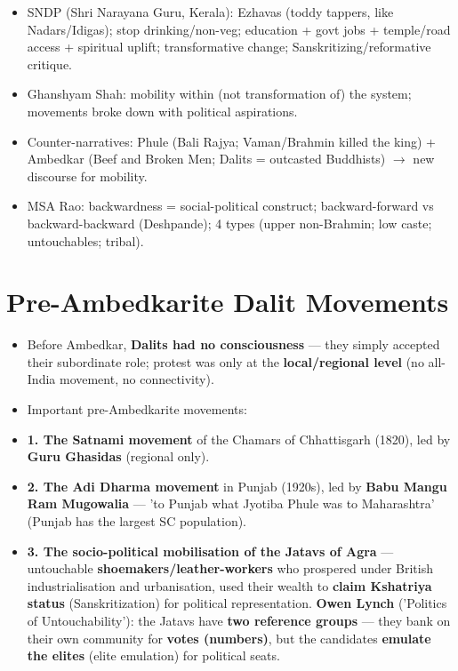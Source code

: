 \begin{QuickRevision}
\begin{itemize}
\item SNDP (Shri Narayana Guru, Kerala): Ezhavas (toddy tappers, like Nadars/Idigas); stop drinking/non-veg; education + govt jobs + temple/road access + spiritual uplift; transformative change; Sanskritizing/reformative critique.
\item Ghanshyam Shah: mobility within (not transformation of) the system; movements broke down with political aspirations.
\item Counter-narratives: Phule (Bali Rajya; Vaman/Brahmin killed the king) + Ambedkar (Beef and Broken Men; Dalits = outcasted Buddhists) $\rightarrow$ new discourse for mobility.
\item MSA Rao: backwardness = social-political construct; backward-forward vs backward-backward (Deshpande); 4 types (upper non-Brahmin; low caste; untouchables; tribal).
\end{itemize}
\end{QuickRevision}

\section{Pre-Ambedkarite Dalit Movements}

\begin{KeyConcept}
\begin{itemize}
\item Before Ambedkar, \textbf{Dalits had no consciousness} --- they simply accepted their subordinate role; protest was only at the \textbf{local/regional level} (no all-India movement, no connectivity).
\item Important pre-Ambedkarite movements:
\item \textbf{1. The Satnami movement} of the Chamars of Chhattisgarh (1820), led by \textbf{Guru Ghasidas} (regional only).
\item \textbf{2. The Adi Dharma movement} in Punjab (1920s), led by \textbf{Babu Mangu Ram Mugowalia} --- 'to Punjab what Jyotiba Phule was to Maharashtra' (Punjab has the largest SC population).
\item \textbf{3. The socio-political mobilisation of the Jatavs of Agra} --- untouchable \textbf{shoemakers/leather-workers} who prospered under British industrialisation and urbanisation, used their wealth to \textbf{claim Kshatriya status} (Sanskritization) for political representation. \textbf{Owen Lynch} ('Politics of Untouchability'): the Jatavs have \textbf{two reference groups} --- they bank on their own community for \textbf{votes (numbers)}, but the candidates \textbf{emulate the elites} (elite emulation) for political seats.
\end{itemize}
\end{KeyConcept}

